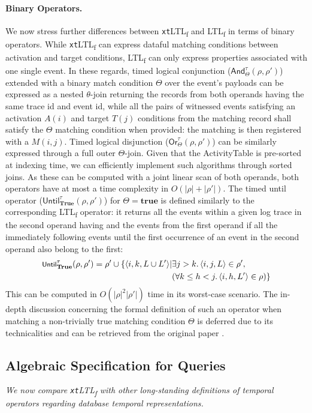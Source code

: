 \documentclass[sigconf]{acmart}
\begin{document}
\paragraph{Binary Operators.} We now stress further differences between \texttt{xt}LTL\textsubscript{f} and LTL\textsubscript{f} in terms of binary operators. While \texttt{xt}LTL\textsubscript{f} can  express dataful matching conditions between activation and target conditions,  LTL\textsubscript{f} can only express properties associated with one single event.
In these regards, timed logical conjunction ($\textsf{And}^\tau_\Theta(\rho,\rho')$) extended with a binary match condition $\Theta$ over the event's payloads can be expressed as a nested $\theta$-join returning the records from both operands having the same trace id and event id, while all the pairs of witnessed events satisfying an activation $A(i)$ and target $T(j)$ conditions from the matching record shall satisfy the $\Theta$ matching condition when provided: the matching is then registered with a $M(i,j)$. Timed logical disjunction ($\textsf{Or}^\tau_\Theta(\rho,\rho')$) can be similarly expressed through a full outer $\Theta$-join. Given that the ActivityTable is pre-sorted at indexing time, we can efficiently implement such algorithms through sorted joins. As these can be computed with a joint linear scan of both operands, both operators have at most a time complexity in $O(|\rho|+|\rho'|)$. The timed until operator ($\textsf{Until}^\tau_{\textbf{True}}(\rho,\rho')$) for $\Theta=\textbf{true}$ is defined similarly to the corresponding LTL\textsubscript{f} operator: it returns all the events within a given log trace in the second operand having and the events from the first operand if all the immediately following events until the first occurrence of an event in the second operand also belong to the first:
		\[\begin{split}
\footnotesize 			\textsf{Until}^\tau_\textbf{True}(\rho,\rho')=\rho'\cup \{\footnotesize\langle i,k,L\cup L'\rangle |&\exists j>k. \braket{i,j,L}\in\rho', \\
&(\forall k\leq h<j. \braket{i,h,L'}\in\rho) \}
\end{split}\]
This can be computed in $O(|\rho|^2|\rho'|)$ time in its worst-case scenario.
 The in-depth discussion concerning the formal definition of such an operator when matching a non-trivially true matching condition $\Theta$ is deferred due to its technicalities and can be retrieved from the original paper \cite{info14030173}.
\bigskip

\subsection{Algebraic Specification for Queries}\label{timecompl}
\textit{We now compare \texttt{xt}LTL\textsubscript{f} with other long-standing definitions of temporal operators regarding database temporal representations.} 
\end{document}

